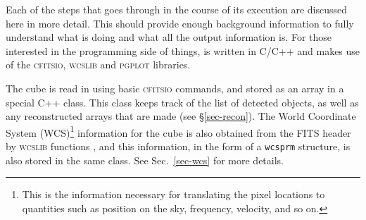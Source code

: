 %
%
%
%
\label{sec-flow}

Each of the steps that \duchamp goes through in the course of its
execution are discussed here in more detail. This should provide
enough background information to fully understand what \duchamp is
doing and what all the output information is. For those interested in
the programming side of things, \duchamp is written in C/C++ and makes
use of the \textsc{cfitsio}, \textsc{wcslib} and \textsc{pgplot}
libraries.

\label{sec-input}

The cube is read in using basic \textsc{cfitsio} commands, and stored
as an array in a special C++ class. This class keeps track of the list
of detected objects, as well as any reconstructed arrays that are made
(see \S\ref{sec-recon}). The World Coordinate System
(WCS)\footnote{This is the information necessary for translating the
  pixel locations to quantities such as position on the sky,
  frequency, velocity, and so on.} information for the cube is also
obtained from the FITS header by \textsc{wcslib} functions
\citep{greisen02, calabretta02,greisen06}, and this information, in
the form of a \texttt{wcsprm} structure, is also stored in the same
class. See Sec.~\ref{sec-wcs} for more details.

